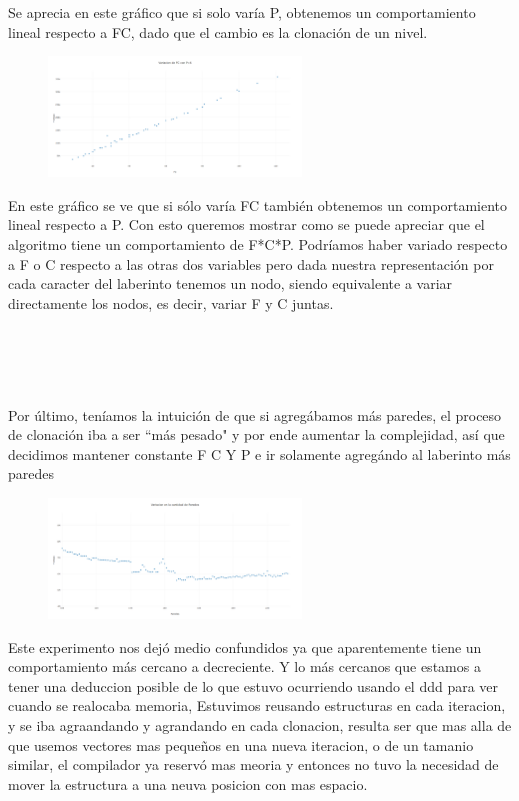 \documentclass[spanish,12pt]{article}
\begin{document}
Se aprecia en este gráfico que si solo varía P, obtenemos un comportamiento lineal respecto a FC, dado que el cambio es la clonación de un nivel.


\begin{figure}[H]
\centering
\includegraphics     [width=0.6\textwidth]{pfijo}
\caption{}
\end{figure}
En este gráfico se ve que si sólo varía FC también obtenemos un comportamiento lineal respecto a P.
Con esto queremos mostrar como se puede apreciar que el algoritmo tiene un comportamiento de F*C*P. Podríamos haber variado respecto a F o C respecto a las otras dos variables pero dada nuestra representación
por cada caracter del laberinto tenemos un nodo, siendo equivalente a variar directamente los nodos, es decir, variar F y C juntas.


\\
\\
\\
\\



Por último, teníamos la intuición de que si agregábamos más paredes, el proceso de clonación iba a ser ``más pesado" y por ende aumentar la complejidad, así que decidimos mantener constante F C Y P e ir solamente agregándo al laberinto más paredes
\begin{figure}[H]
\centering
\includegraphics     [width=0.6\textwidth]{paredesfijas}
\caption{}
\end{figure}

Este experimento nos dejó medio confundidos ya que aparentemente tiene un comportamiento más cercano a decreciente. Y lo más cercanos que estamos a tener una deduccion posible de lo que estuvo ocurriendo  usando el ddd para ver cuando se realocaba memoria,
Estuvimos reusando estructuras en cada iteracion, y se iba agraandando y agrandando en cada clonacion,  resulta ser que mas alla de que usemos vectores mas pequeños en una nueva iteracion, o de un tamanio similar, el compilador ya reservó mas meoria y entonces no tuvo la necesidad de mover la estructura a una neuva posicion con mas espacio.
\end{document}
